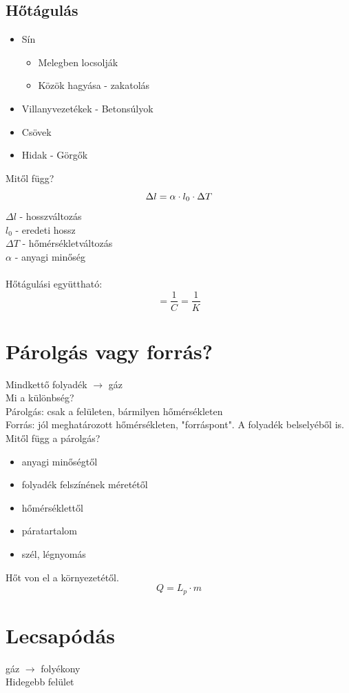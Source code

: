 \documentclass{article}
\theoremstyle{definition}
\begin{document}
\subsection{Hőtágulás}

\begin{itemize}
    \item Sín \begin{itemize}
        \item Melegben locsolják
        \item Közök hagyása - zakatolás
    \end{itemize}
    \item Villanyvezetékek - Betonsúlyok
    \item Csövek %
    \item Hidak - Görgők %
\end{itemize}

Mitől függ?
\begin{equation}
    \Delta l = \alpha \cdot l_{0} \cdot \Delta T \\
\end{equation}
$\Delta l$ - hosszváltozás \\
$l_{0}$ - eredeti hossz \\
$\Delta T$ - hőmérsékletváltozás \\
$\alpha$ - anyagi minőség\\ \\
Hőtágulási együttható:
\begin{equation}
    [\alpha]=\frac{1}{C} = \frac{1}{K}
\end{equation}



\section{Párolgás vagy forrás?}
Mindkettő folyadék $\rightarrow$ gáz\\
Mi a különbség?\\
Párolgás: csak a felületen, bármilyen hőmérsékleten\\
Forrás: jól meghatározott hőmérsékleten, "forráspont". A folyadék belselyéből is.
\\
Mitől függ a párolgás? 
\begin{itemize}
    \item anyagi minőségtől
    \item folyadék felszínének méretétől
    \item hőmérséklettől
    \item páratartalom
    \item szél, légnyomás
\end{itemize}

Hőt von el a környezetétől.
\[
Q = L_p \cdot m
\]

\section{Lecsapódás}
gáz $\rightarrow$ folyékony\\
Hidegebb felület
\end{document}
